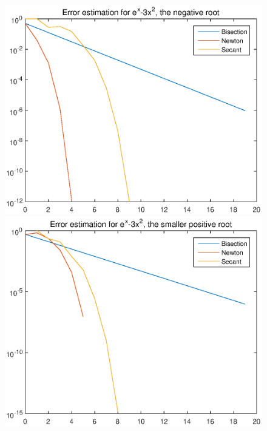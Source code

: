 \begin{figure}
\centering
\begin{minipage}{0.45\textwidth}
\includegraphics[width = \textwidth]{resa1.eps}
\end{minipage}
\begin{minipage}{0.45\textwidth}
\includegraphics[width = \textwidth]{resa2.eps}
\end{minipage}


\end{figure}
